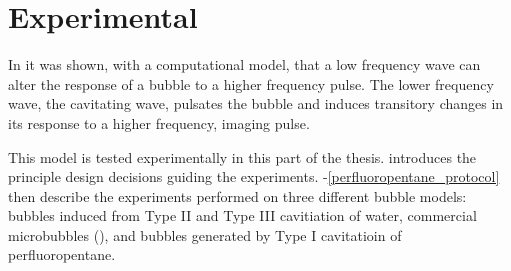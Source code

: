 
\part{Experimental}\label{part:experimental}

\begin{quote}

\end{quote}



In  it was shown, with a computational model,
that a low frequency wave can alter the response of a bubble to a higher frequency pulse.
The lower frequency wave, the cavitating wave,
pulsates the bubble and induces transitory changes in its response to a higher frequency, imaging pulse.

This model is tested experimentally in this part of the thesis.
 introduces the principle design decisions guiding the experiments.
-\ref{perfluoropentane_protocol}
then describe the experiments performed on three different bubble models: 
bubbles induced from Type II and Type III  cavitiation of water,
commercial microbubbles (\Sonovue),
and bubbles generated by Type I cavitatioin of perfluoropentane.


